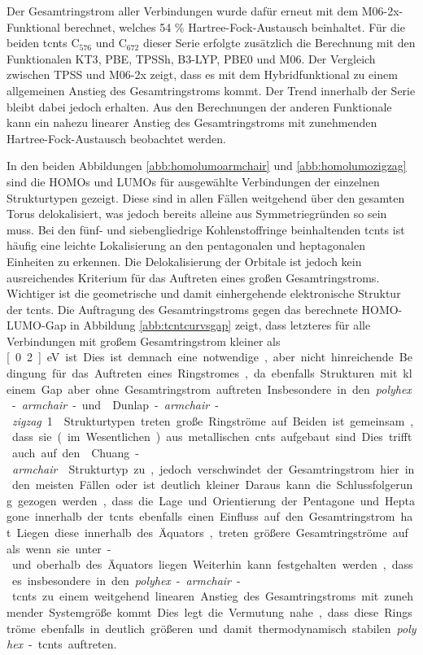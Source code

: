 Der Gesamtringstrom aller Verbindungen wurde dafür erneut mit dem M06-2x-Funktional\supercite{zhao2008m06} berechnet, welches 54 \% Hartree-Fock-Austausch beinhaltet. Für die beiden \acp{tcnt} C$_{576}$ und C$_{672}$ dieser Serie erfolgte zusätzlich die Berechnung mit den Funktionalen KT3\supercite{keal2004semiempirical}, PBE\supercite{perdew1996generalized}, TPSSh\supercite{staroverov2003comparative}, B3-LYP\supercite{becke1993density,lee1988development,stephens1994ab}, PBE0\supercite{adamo1999toward} und M06\supercite{zhao2008m06}. Der Vergleich zwischen TPSS und M06-2x zeigt, dass es mit dem Hybridfunktional zu einem allgemeinen Anstieg des Gesamtringstroms kommt. Der Trend innerhalb der Serie bleibt dabei jedoch erhalten. Aus den Berechnungen der anderen Funktionale kann ein nahezu linearer Anstieg des Gesamtringstroms mit zunehmenden Hartree-Fock-Austausch beobachtet werden.

\bigskip
In den beiden Abbildungen \ref{abb:homolumoarmchair} und \ref{abb:homolumozigzag} sind die HOMOs und LUMOs für ausgewählte Verbindungen der einzelnen Strukturtypen gezeigt. Diese sind in allen Fällen weitgehend über den gesamten Torus delokalisiert, was jedoch bereits alleine aus Symmetriegründen so sein muss. Bei den fünf- und siebengliedrige Kohlenstoffringe beinhaltenden \acp{tcnt} ist häufig eine leichte Lokalisierung an den pentagonalen und heptagonalen Einheiten zu erkennen. Die Delokalisierung der Orbitale ist jedoch kein ausreichendes Kriterium für das Auftreten eines großen Gesamtringstroms. Wichtiger ist die geometrische und damit einhergehende elektronische Struktur der \acp{tcnt}. Die Auftragung des Gesamtringstroms gegen das berechnete HOMO-LUMO-Gap in Abbildung \ref{abb:tcntcurvsgap} zeigt, dass letzteres für alle Verbindungen mit großem Gesamtringstrom kleiner als \unit[0.2]{eV} ist. Dies ist demnach eine notwendige, aber nicht hinreichende Bedingung für das Auftreten eines Ringstromes, da ebenfalls Strukturen mit kleinem Gap aber ohne Gesamtringstrom auftreten. Insbesondere in den \textit{polyhex}-\textit{armchair}- und \glqq Dunlap-\textit{armchair}-\textit{zigzag} 1\grqq{} Strukturtypen treten große Ringströme auf. Beiden ist gemeinsam, dass sie (im Wesentlichen) aus metallischen \acp{cnt} aufgebaut sind. Dies trifft auch auf den \glqq Chuang-\textit{armchair}\grqq{} Strukturtyp zu, jedoch verschwindet der Gesamtringstrom hier in den meisten Fällen oder ist deutlich kleiner. Daraus kann die Schlussfolgerung gezogen werden, dass die Lage und Orientierung der Pentagone und Heptagone innerhalb der \acp{tcnt} ebenfalls einen Einfluss auf den Gesamtringstrom hat. Liegen diese innerhalb des Äquators, treten größere Gesamtringströme auf als wenn sie unter- und oberhalb des Äquators liegen. Weiterhin kann festgehalten werden, dass es insbesondere in den \textit{polyhex}-\textit{armchair}-\acp{tcnt} zu einem weitgehend linearen Anstieg des Gesamtringstroms mit zunehmender Systemgröße kommt. Dies legt die Vermutung nahe, dass diese Ringströme ebenfalls in deutlich größeren und damit thermodynamisch stabilen \textit{polyhex}-\acp{tcnt} auftreten.

